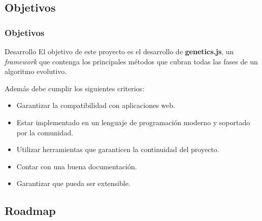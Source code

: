 \documentclass{beamer}
\begin{document}
\subsection{Objetivos}

\begin{frame}
\frametitle{Objetivos}

\begin{block}{Desarrollo}
 El objetivo de este proyecto es el desarrollo de \textbf{genetics.js}, un \textit{framework} que contenga los principales métodos que cubran todas las fases de un algoritmo evolutivo.
\end{block}

\bigskip

Además debe cumplir los siguientes criterios:

\begin{itemize}
    \item Garantizar la compatibilidad con aplicaciones web.
    \item Estar implementado en un lenguaje de programación moderno y soportado por la comunidad.
    \item Utilizar herramientas que garanticen la continuidad del proyecto.
    \item Contar con una buena documentación.
    \item Garantizar que pueda ser extensible.
\end{itemize}

\end{frame}

\subsection{Roadmap}
\end{document}
